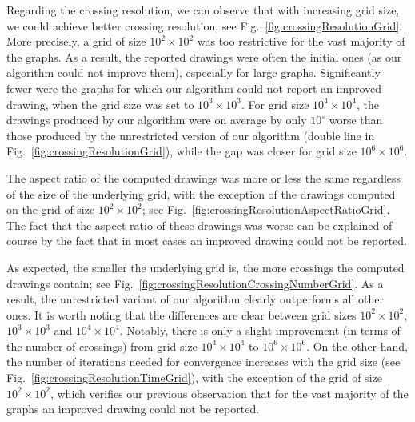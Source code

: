 \documentclass[runningheads]{llncs}
\begin{document}
{Regarding the crossing resolution, we can observe that with increasing grid size, we could achieve better crossing resolution; see Fig.~\ref{fig:crossingResolutionGrid}. More precisely, a grid of size $10^2 \times 10^2$ was too restrictive for the vast majority of the graphs. As a result, the reported drawings were often the initial ones (as our algorithm could not improve them), especially for large graphs. Significantly fewer were the graphs for which our algorithm could not report an improved drawing, when the grid size was set to $10^3 \times 10^3$.
For grid size $10^4 \times 10^4$, the drawings produced by our algorithm were on average by only $10^\circ$ worse than those produced by the unrestricted version of our algorithm (double line in Fig.~\ref{fig:crossingResolutionGrid}), while the gap was closer for grid size $10^6 \times 10^6$.

The aspect ratio of the computed drawings was more or less the same regardless of the size of the underlying grid, with the exception of the drawings computed on the grid of size $10^2 \times 10^2$; see Fig.~\ref{fig:crossingResolutionAspectRatioGrid}. The fact that the aspect ratio of these drawings was worse can be explained of course by the fact that in most cases an improved drawing could not be reported.

As expected, the smaller the underlying grid is, the more crossings the computed drawings contain; see Fig.~\ref{fig:crossingResolutionCrossingNumberGrid}. As a result, the unrestricted variant of our algorithm clearly outperforms all other ones. It is worth noting that the differences are clear between grid sizes $10^2 \times 10^2$, $10^3 \times 10^3$ and $10^4 \times 10^4$. Notably, there is only a slight improvement (in terms of the number of crossings) from grid size $10^4 \times 10^4$ to $10^6 \times 10^6$. %
%
On the other hand, the number of iterations needed for convergence increases with the grid size (see Fig.~\ref{fig:crossingResolutionTimeGrid}), with the exception of the grid of size $10^2 \times 10^2$, which verifies our previous observation that for the vast majority of the graphs an improved drawing could not be reported.

}
\end{document}
